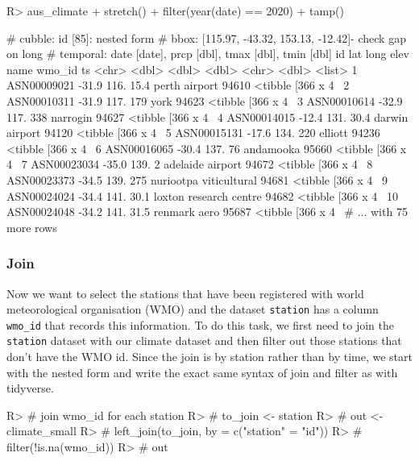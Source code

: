 \documentclass[
]{jss}
\begin{document}
\begin{CodeChunk}
\begin{CodeInput}
R> aus_climate %
+   stretch() %
+   filter(year(date) == 2020) %
+   tamp()
\end{CodeInput}
\begin{CodeOutput}
# cubble:   id [85]: nested form
# bbox:     [115.97, -43.32, 153.13, -12.42]- check gap on long
# temporal: date [date], prcp [dbl], tmax [dbl], tmin [dbl]
   id            lat  long  elev name                   wmo_id ts               
   <chr>       <dbl> <dbl> <dbl> <chr>                   <dbl> <list>           
 1 ASN00009021 -31.9  116.  15.4 perth airport           94610 <tibble [366 x 4~
 2 ASN00010311 -31.9  117. 179   york                    94623 <tibble [366 x 4~
 3 ASN00010614 -32.9  117. 338   narrogin                94627 <tibble [366 x 4~
 4 ASN00014015 -12.4  131.  30.4 darwin airport          94120 <tibble [366 x 4~
 5 ASN00015131 -17.6  134. 220   elliott                 94236 <tibble [366 x 4~
 6 ASN00016065 -30.4  137.  76   andamooka               95660 <tibble [366 x 4~
 7 ASN00023034 -35.0  139.   2   adelaide airport        94672 <tibble [366 x 4~
 8 ASN00023373 -34.5  139. 275   nuriootpa viticultural  94681 <tibble [366 x 4~
 9 ASN00024024 -34.4  141.  30.1 loxton research centre  94682 <tibble [366 x 4~
10 ASN00024048 -34.2  141.  31.5 renmark aero            95687 <tibble [366 x 4~
# ... with 75 more rows
\end{CodeOutput}
\end{CodeChunk}

\hypertarget{join}{%
\subsubsection{Join}\label{join}}

Now we want to select the stations that have been registered with world
meteorological organisation (WMO) and the dataset \texttt{station} has a
column \texttt{wmo\_id} that records this information. To do this task,
we first need to join the \texttt{station} dataset with our climate
dataset and then filter out those stations that don't have the WMO id.
Since the join is by station rather than by time, we start with the
nested form and write the exact same syntax of join and filter as with
tidyverse.

\begin{CodeChunk}
\begin{CodeInput}
R> # join wmo_id for each station
R> # to_join <- station %
R> # out <- climate_small %
R> #   left_join(to_join, by = c("station" = "id")) %
R> #   filter(!is.na(wmo_id))
R> # out
\end{CodeInput}
\end{CodeChunk}
\end{document}
